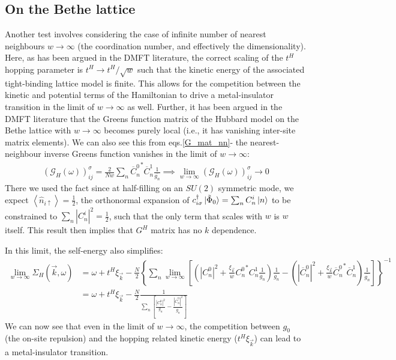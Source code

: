 \documentclass{report}
\numberwithin{equation}{section}
\begin{document}
\subsection{On the Bethe lattice}
Another test involves considering the case of infinite number of nearest neighbours $w\to\infty$ (the coordination number, and effectively the dimensionality). Here, as has been argued in the DMFT literature, the correct scaling of the $t^{H}$ hopping parameter is $t^{H}\to t^{H}/\sqrt{w}$ such that the kinetic energy of the associated tight-binding lattice model is finite. This allows for the competition between the kinetic and potential terms of the Hamiltonian to drive a metal-insulator transition in the limit of $w\to\infty$ as well. Further, it has been argued in the DMFT literature that the Greens function matrix of the Hubbard model on the Bethe lattice with $w\to\infty$ becomes purely local (i.e., it has vanishing inter-site matrix elements). We can also see this from eqs.\eqref{G_mat_nn}- the nearest-neighbour inverse Greens function vanishes in the limit of $w \to \infty$:
\begin{equation}\begin{aligned}
	\left(\mathcal{G}_{H}(\omega)\right)_{ij}^\sigma = \frac{2}{Nw}\sum_{n} {\overline C^0_{n}}^* \overline C^1_{n} \frac{1}{\overline{g_n}} \implies \lim_{w \to \infty}\left(\mathcal{G}_{H}(\omega)\right)_{ij}^\sigma \to 0
\end{aligned}\end{equation}
There we used the fact since at half-filling on an $SU(2)$ symmetric mode, we expect $\left<\hat n_{i \uparrow} \right> = \frac{1}{2}$, the orthonormal expansion of $c^\dagger_{i \sigma}\ket{\tilde \Phi_0} = \sum_n C^i_n \ket{n}$ to be constrained to $\sum_n |C_n^i|^2 = \frac{1}{2}$, such that the only term that scales with $w$ is $w$ itself. This result then implies that $G^{H}$ matrix has no $k$ dependence. 

In this limit, the self-energy also simplifies:
\begin{equation}\begin{aligned}
	\lim_{w \to \infty}\Sigma_H(\vec k,\omega) &= \omega +t^{H}\xi_{\vec k} - \frac{N}{2}\left\{\sum_n \lim_{w \to \infty}\left[\left(|C^0_{n}|^2 + \frac{\xi_{\vec{k}}}{w}{C^0_{n}}^* C^1_{n} \frac{1}{g_n}\right)\frac{1}{g_n} - \left(|\overline C^0_{n}|^2 + \frac{\xi_{\vec{k}}}{w}{\overline C^0_{n}}^* \overline C^1_{n}\right)\frac{1}{\overline{g_n}}\right]\right\}^{-1} \\
						   &=\omega +t^{H}\xi_{\vec k} - \frac{N}{2}\frac{1}{\sum_n \left[ \frac{|C^0_{n}|^2}{g_n} - \frac{|\overline C^0_{n}|^2}{\overline{g_n}}\right]}
\end{aligned}\end{equation}
We can now see that even in the limit of $w\to\infty$, the competition between ${g}_{0}$ (the on-site repulsion) and the hopping related kinetic energy ($t^{H}\xi_{\vec{k}}$) can lead to a metal-insulator transition.
\end{document}
